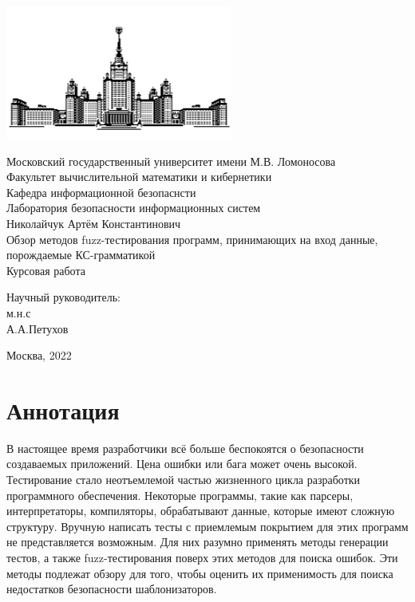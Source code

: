 \documentclass[a4paper]{article}
\begin{document}
 
\begin{center}
\includegraphics{MSU}

\hfill \break
\normalsize{Московский государственный университет имени М.В. Ломоносова}\\
\normalsize{Факультет вычислительной математики и кибернетики}\\
\normalsize{Кафедра информационной безопаснсти}\\
\normalsize{Лаборатория безопасности информационных систем}\\
 \hfill \break
\normalsize{Николайчук Артём Константинович}\\
\hfill\break
\hfill \break
\hfill \break
\hfill \break
\large{Обзор методов fuzz-тестирования программ, принимающих на вход
данные, порождаемые КС-грамматикой}\\
\hfill \break
\hfill \break
\hfill \break
\normalsize{Курсовая работа}\\
\hfill \break
\hfill \break
\hfill \break
\hfill \break
\hfill \break
\hfill \break
\hfill \break
\hfill \break
\begin{flushright}
    \normalsize{Научный руководитель:}\\
    \normalsize{м.н.с}\\
    \normalsize{А.А.Петухов}\\
\end{flushright}
\end{center}
\vspace*{\fill}
\begin{center} Москва, 2022 \end{center}
\thispagestyle{empty}
 
\newpage
\section*{Аннотация}
\indent

В настоящее время разработчики всё больше беспокоятся о безопасности создаваемых приложений. Цена ошибки или бага может очень высокой. Тестирование стало неотъемлемой частью жизненного цикла разработки программного обеспечения. Некоторые программы, такие как парсеры, интерпретаторы, компиляторы, обрабатывают данные, которые имеют сложную структуру. Вручную написать тесты с приемлемым покрытием для этих программ не представляется возможным. Для них разумно применять методы
генерации тестов, а также fuzz-тестирования поверх этих методов для
поиска ошибок. Эти методы подлежат обзору для того, чтобы оценить их
применимость для поиска недостатков безопасности шаблонизаторов.
\newpage
    \tableofcontents
\newpage
 
\end{document}
